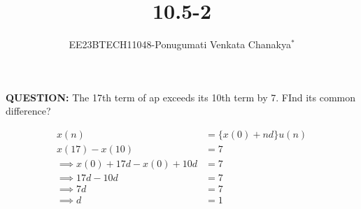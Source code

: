 \documentclass[journal,12pt,onecolumn]{IEEEtran}
\theoremstyle{remark}
\begin{document}
 
 \vspace{3cm}
 \title{\textbf{10.5-2}}
 \author{EE23BTECH11048-Ponugumati Venkata Chanakya$^{*}$%
 }
 \maketitle

 \bigskip
 \renewcommand{\thefigure}{\theenumi}
 \renewcommand{\thetable}{\theenumi}
 \textbf{QUESTION:}
 The 17th term of ap exceeds its 10th term by 7. FInd its common difference?\\
 \solution

 \begin{align}
     x(n) &= \{x(0)+nd\}u(n) \label{eq 10.5.2_1}\\
     x(17)-x(10) &= 7\\
    \implies {x(0)+17d}-{x(0)+10d} &= 7\\
    \implies 17d-10d &= 7\\
    \implies 7d &= 7\\
    \implies d &= 1
 \end{align}
\end{document}
